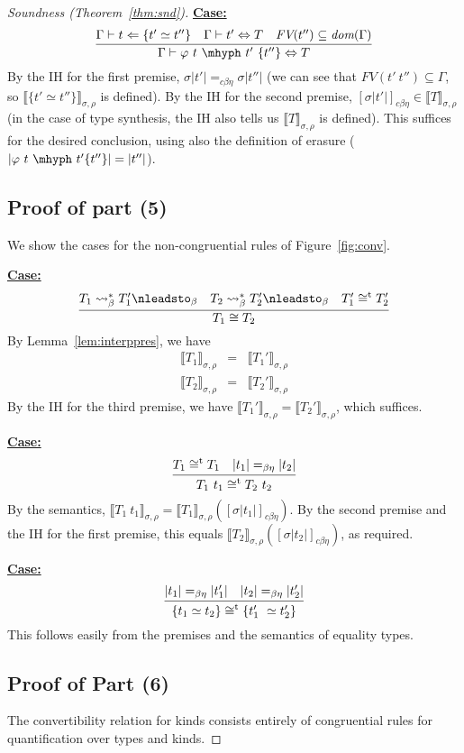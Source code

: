 \documentclass{article}
\newcommand{\interp}[1]{\llbracket #1 \rrbracket}
\newcommand{\tpcheck}[0]{\Leftarrow}
\newcommand{\cbe}[0]{c\beta\eta}
\newcommand{\startcase}[1]{\vspace{#1} \noindent\textbf{\underline{Case:}}}
\begin{document}
\begin{proof}[Soundness (Theorem~\ref{thm:snd})]
\startcase{.2cm}
\[
  \infer{\Gamma\vdash \varphi\ t\ \mhyph\ t'\ \{t''\} \Leftrightarrow T}
  {
    \Gamma\vdash t\tpcheck \{t' \simeq t''\}
    & \Gamma\vdash t' \Leftrightarrow T
    & \textit{FV}(t'') \subseteq \textit{dom}(\Gamma)
  }
\]
By the IH for the first premise, $\sigma|t'| =_{\cbe} \sigma|t''|$ (we can see
that \(\textit{FV}(t'\ t'') \subseteq \Gamma\), so \(\interp{\{t' \simeq
  t''\}}_{\sigma,\rho}\) is defined).
By the IH for the second premise,
$[\sigma|t'|]_{\cbe}\in\interp{T}_{\sigma,\rho}$ (in the case of type synthesis,
the IH also tells us \(\interp{T}_{\sigma,\rho}\) is defined).
This suffices for the desired conclusion, using also the definition of erasure
($|\varphi\ t\ \mhyph\ t'\{t''\}| = |t''|$).

\subsection*{Proof of part (5) }
We show the cases for the non-congruential rules of Figure~\ref{fig:conv}.

\startcase{.2cm}
\[
  \infer{
    T_1 \cong T_2
  }{
    T_1 \leadsto^*_\beta T_1' \nleadsto_\beta
    \quad T_2 \leadsto^*_\beta T_2' \nleadsto_\beta
    \quad T_1' \cong^{\text{t}} T_2'
  }
\]
By Lemma~\ref{lem:interppres}, we have
\[
\begin{array}{lll}
  \interp{T_1}_{\sigma,\rho} & = & \interp{T_1'}_{\sigma,\rho}\\
  \interp{T_2}_{\sigma,\rho} & = & \interp{T_2'}_{\sigma,\rho}
\end{array}
\]
By the IH for the third premise, we have $\interp{T_1'}_{\sigma,\rho} = \interp{T_2'}_{\sigma,\rho}$,
which suffices.

\startcase{.2cm}
\[
    \infer{T_1\ t_1 \cong^{\text{t}} T_2\ t_2}{T_1 \cong^{\text{t}} T_1 & |t_1| =_{\beta\eta} |t_2|}
\]
By the semantics, $\interp{T_1\ t_1}_{\sigma,\rho} =
\interp{T_1}_{\sigma,\rho}([\sigma|t_1|]_{\cbe})$.  By the second premise
and the IH for the first premise, this equals
$\interp{T_2}_{\sigma,\rho}([\sigma|t_2|]_{\cbe})$, as required.

\startcase{.2cm}
\[
    \infer{\{ t_1 \simeq t_2 \} \cong^{\text{t}} \{ t_1'\ \simeq t_2' \}}{|t_1| =_{\beta\eta} |t_1'| & |t_2| =_{\beta\eta} |t_2'|}
\]
This follows easily from the premises and the semantics of equality types.

\subsection*{Proof of Part (6)}

The convertibility relation for kinds consists entirely of congruential rules
for quantification over types and kinds.

\end{proof}
\end{document}
